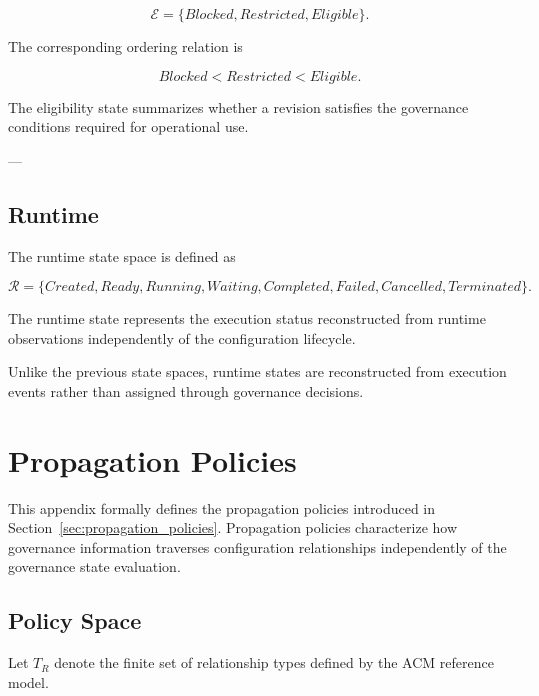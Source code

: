 \documentclass[10pt]{article}
\begin{document}
	\begin{equation}
		\mathcal{E}=
		\{
		Blocked,
		Restricted,
		Eligible
		\}.
		\label{eq:eligibility_space}
	\end{equation}
	
	The corresponding ordering relation is
	
	\begin{equation}
		Blocked
		<
		Restricted
		<
		Eligible.
		\label{eq:eligibility_order}
	\end{equation}
	
	The eligibility state summarizes whether a revision satisfies the governance conditions required for operational use.
	
	---
	
	\subsection{Runtime}
	
	The runtime state space is defined as
	
	\begin{equation}
		\mathcal{R}=
		\{
		Created,
		Ready,
		Running,
		Waiting,
		Completed,
		Failed,
		Cancelled,
		Terminated
		\}.
		\label{eq:runtime_space}
	\end{equation}
	
	The runtime state represents the execution status reconstructed from runtime observations independently of the configuration lifecycle.
	
	Unlike the previous state spaces, runtime states are reconstructed from execution events rather than assigned through governance decisions.
	
	
	
	\section{Propagation Policies}
	\label{appendix:propagation_policies}
	
	This appendix formally defines the propagation policies introduced in Section~\ref{sec:propagation_policies}. Propagation policies characterize how governance information traverses configuration relationships independently of the governance state evaluation.
	
	\subsection{Policy Space}
	
	Let $T_R$ denote the finite set of relationship types defined by the ACM reference model.
	
\end{document}
